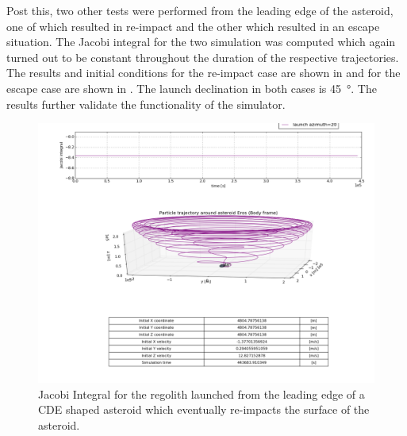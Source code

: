 \FloatBarrier
Post this, two other tests were performed from the leading edge of the asteroid, one of which resulted in re-impact and the other which resulted in an escape situation. The Jacobi integral for the two simulation was computed which again turned out to be constant throughout the duration of the respective trajectories. The results and initial conditions for the re-impact case are shown in  and for the escape case are shown in . The launch declination in both cases is \SI{45}{\degree}. The results further validate the functionality of the simulator.
\begin{figure}[htb]
\centering
\captionsetup{justification=centering}
\includegraphics[angle=90, height=0.8\textheight, keepaspectratio=true]{Images/jacobi_test_after_asteroid_interaction_long_term_simulation.png}
\caption{Jacobi Integral for the regolith launched from the leading edge of a \gls{CDE} shaped asteroid which eventually re-impacts the surface of the asteroid.}
\label{fig:cde_asteroid_jacobi_reimpact_vv}
\end{figure}
\FloatBarrier
